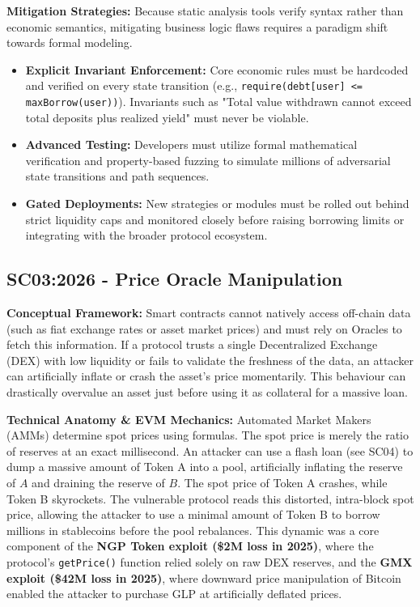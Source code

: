 \textbf{Mitigation Strategies:} Because static analysis tools verify syntax rather than economic semantics, mitigating business logic flaws requires a paradigm shift towards formal modeling. 
\begin{itemize}
    \item \textbf{Explicit Invariant Enforcement:} Core economic rules must be hardcoded and verified on every state transition (e.g., \texttt{require(debt[user] <= maxBorrow(user))}). Invariants such as "Total value withdrawn cannot exceed total deposits plus realized yield" must never be violable.
    \item \textbf{Advanced Testing:} Developers must utilize formal mathematical verification and property-based fuzzing to simulate millions of adversarial state transitions and path sequences.
    \item \textbf{Gated Deployments:} New strategies or modules must be rolled out behind strict liquidity caps and monitored closely before raising borrowing limits or integrating with the broader protocol ecosystem.
\end{itemize}

\subsection{SC03:2026 - Price Oracle Manipulation}
\textbf{Conceptual Framework:} Smart contracts cannot natively access off-chain data (such as fiat exchange rates or asset market prices) and must rely on Oracles to fetch this information. If a protocol trusts a single Decentralized Exchange (DEX) with low liquidity or fails to validate the freshness of the data, an attacker can artificially inflate or crash the asset's price momentarily. This behaviour can drastically overvalue an asset just before using it as collateral for a massive loan.

\textbf{Technical Anatomy \& EVM Mechanics:} Automated Market Makers (AMMs) determine spot prices using formulas. The spot price is merely the ratio of reserves at an exact millisecond. An attacker can use a flash loan (see SC04) to dump a massive amount of Token A into a pool, artificially inflating the reserve of $A$ and draining the reserve of $B$. The spot price of Token A crashes, while Token B skyrockets. The vulnerable protocol reads this distorted, intra-block spot price, allowing the attacker to use a minimal amount of Token B to borrow millions in stablecoins before the pool rebalances. This dynamic was a core component of the \textbf{NGP Token exploit (\$2M loss in 2025)}, where the protocol's \texttt{getPrice()} function relied solely on raw DEX reserves, and the \textbf{GMX exploit (\$42M loss in 2025)}, where downward price manipulation of Bitcoin enabled the attacker to purchase GLP at artificially deflated prices.

